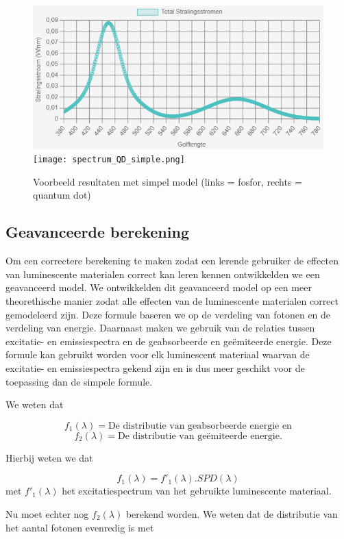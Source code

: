 \begin{figure}[H]
    \centering
    \includegraphics[width=0.45\linewidth]{figs/spectrum_fosfor_simple.png}
    \texttt{[image: spectrum\_QD\_simple.png]}
    \caption{Voorbeeld resultaten met simpel model (links = fosfor, rechts = quantum dot)}%
    \label{fig:result_simple}
\end{figure}

\subsection{Geavanceerde berekening}\label{sec:advanced}

Om een correctere berekening te maken zodat een lerende gebruiker de effecten van luminescente materialen correct kan leren kennen ontwikkelden we een geavanceerd model. We ontwikkelden dit geavanceerd model op een meer theorethische manier zodat alle effecten van de luminescente materialen correct gemodeleerd zijn.
Deze formule baseren we op de verdeling van fotonen en de verdeling van energie.
Daarnaast maken we gebruik van de relaties tussen excitatie- en emissiespectra en de
geabsorbeerde en ge\"emiteerde energie.
Deze formule kan gebruikt worden voor elk luminescent materiaal waarvan de
excitatie- en emissiespectra gekend zijn en is dus meer geschikt voor de toepassing dan de simpele formule.

We weten dat 

\begin{equation}
    f_1(\lambda) = \text{De distributie van geabsorbeerde energie en}
\end{equation}
\begin{equation}
    f_2(\lambda) = \text{De distributie van ge\"emiteerde energie}.
\end{equation}

Hierbij weten we dat 

\begin{equation}
    f_1(\lambda) = f'_1(\lambda) . SPD(\lambda)
\end{equation}
met $f'_1(\lambda)$ het excitatiespectrum van het gebruikte luminescente materiaal.

Nu moet echter nog $f_2(\lambda)$ berekend worden. We weten dat de distributie van het aantal fotonen evenredig is met

